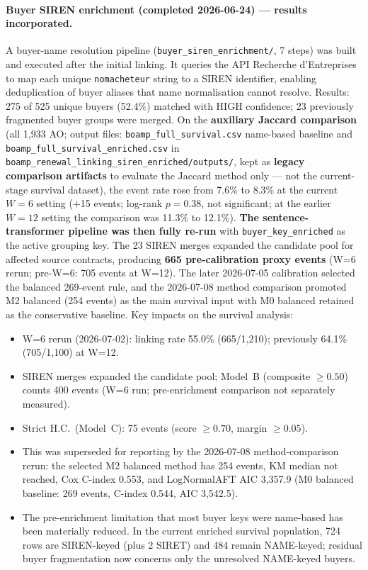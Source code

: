 \documentclass[12pt, a4paper]{article}
\begin{document}
\paragraph*{Buyer SIREN enrichment (completed 2026-06-24) --- results incorporated.}
A buyer-name resolution pipeline (\texttt{buyer\_siren\_enrichment/}, 7 steps)
was built and executed after the initial linking.
It queries the API Recherche d'Entreprises to map each unique
\texttt{nomacheteur} string to a SIREN identifier, enabling deduplication
of buyer aliases that name normalisation cannot resolve.
Results: 275 of 525 unique buyers (52.4\%) matched with HIGH confidence;
23 previously fragmented buyer groups were merged.
On the \textbf{auxiliary Jaccard comparison} (all 1,933 AO; output files:
\nolinkurl{boamp_full_survival.csv} name-based baseline and
\nolinkurl{boamp_full_survival_enriched.csv} in
\nolinkurl{boamp_renewal_linking_siren_enriched/outputs/}, kept as
\textbf{legacy comparison artifacts} to evaluate the Jaccard method only ---
not the current-stage survival dataset), the event rate rose from 7.6\% to
8.3\% at the current $W=6$ setting ($+$15 events; log-rank $p = 0.38$, not
significant; at the earlier $W=12$ setting the comparison was 11.3\% to 12.1\%).
\textbf{The sentence-transformer pipeline was then fully re-run} with
\texttt{buyer\_key\_enriched} as the active grouping key.
The 23 SIREN merges expanded the candidate pool for affected source contracts,
producing \textbf{665 pre-calibration proxy events} (W=6 rerun; pre-W=6:
705 events at W=12). The later 2026-07-05 calibration selected the balanced 269-event rule, and
the 2026-07-08 method comparison promoted M2 balanced (254 events) as the
main survival input with M0 balanced retained as the conservative baseline.
Key impacts on the survival analysis:
\begin{itemize}
  \item W=6 rerun (2026-07-02): linking rate 55.0\% (665/1,210); previously 64.1\% (705/1,100) at W=12.
  \item SIREN merges expanded the candidate pool; Model~B (composite $\geq 0.50$)
        counts 400 events (W=6 run; pre-enrichment comparison not separately measured).
  \item Strict H.C.\ (Model~C): 75 events (score $\geq 0.70$, margin $\geq 0.05$).
  \item This was superseded for reporting by the 2026-07-08 method-comparison
        rerun: the selected M2 balanced method has 254 events, KM median not
        reached, Cox C-index 0.553, and LogNormalAFT AIC 3,357.9 (M0 balanced
        baseline: 269 events, C-index 0.544, AIC 3,542.5).
    \item The pre-enrichment limitation that most buyer keys were name-based has
      been materially reduced. In the current enriched survival population,
      724 rows are SIREN-keyed (plus 2 SIRET) and 484 remain NAME-keyed; residual
      buyer fragmentation now concerns only the unresolved NAME-keyed buyers.
\end{itemize}
\end{document}
